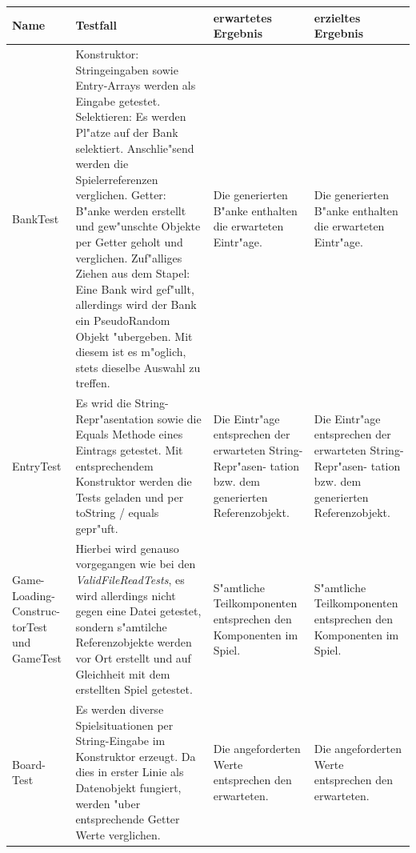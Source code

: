 \begin{longtable}{|p{1.5cm}|p{7.5cm}|p{2cm}|p{2cm}|}
	\hline
	Name & Testfall & erwartetes Ergebnis & erzieltes Ergebnis \\
	\hline

	
	BankTest & 
Konstruktor: Stringeingaben sowie Entry-Arrays werden als Eingabe getestet. 
	\newline Selektieren: Es werden Pl"atze auf der Bank selektiert. Anschlie"send werden die Spielerreferenzen verglichen.
	\newline Getter: B"anke werden erstellt und gew"unschte Objekte per Getter geholt und verglichen.
	\newline Zuf"alliges Ziehen aus dem Stapel: Eine Bank wird gef"ullt, allerdings wird der Bank ein PseudoRandom Objekt "ubergeben. Mit diesem ist es m"oglich, stets dieselbe Auswahl zu treffen. 
	& Die generierten B"anke enthalten die erwarteten Eintr"age. 
 	& Die generierten B"anke enthalten die erwarteten Eintr"age. \\
 	
 	\hline 
 	
	EntryTest
	& Es wrid die String-Repr"asentation sowie die Equals Methode eines Eintrags getestet. Mit entsprechendem Konstruktor werden die Tests geladen und per toString / equals gepr"uft. 
	& Die Eintr"age entsprechen der erwarteten String-Repr"asen- \newline tation bzw. dem generierten Referenzobjekt.
	& Die Eintr"age entsprechen der erwarteten String-Repr"asen- \newline tation bzw. dem generierten Referenzobjekt. \\
	
 	\hline 
 	
 	Game- \newline Loading- \newline Construc- \newline torTest und GameTest
 	& Hierbei wird genauso vorgegangen wie bei den \emph{ValidFileReadTests}, es wird allerdings nicht gegen eine Datei getestet, sondern s"amtilche Referenzobjekte werden vor Ort erstellt und auf Gleichheit mit dem erstellten Spiel getestet. 
 	& S"amtliche Teilkomponenten entsprechen den Komponenten im Spiel. 
 	& S"amtliche Teilkomponenten entsprechen den Komponenten im Spiel. \\
 	
  	\hline 
 	
	Board- \newline Test
	& Es werden diverse Spielsituationen per String-Eingabe im Konstruktor erzeugt. Da dies in erster Linie als Datenobjekt fungiert, werden "uber entsprechende Getter Werte verglichen. 
	& Die angeforderten Werte entsprechen den erwarteten. 
	& Die angeforderten Werte entsprechen den erwarteten. \\
	

\end{longtable}
